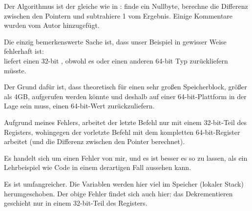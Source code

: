 



Der Algorithmus ist der gleiche wie in : 
finde ein Nullbyte, berechne die Differenz zwischen den Pointern und subtrahiere
1 vom Ergebnis. 
Einige Kommentare wurden vom Autor hinzugefügt.

Die einzig bemerkenswerte Sache ist, dass unser Beispiel in gewisser Weise
fehlerhaft ist:\\
 liefert einen 32-bit \Tint, obwohl es  oder
einen anderen 64-bit Typ zurückliefern müsste.

Der Grund dafür ist, dass  theoretisch für einen sehr großen
Speicherblock, größer als 4GB, aufgerufen werden könnte und deshalb auf einer
64-bit-Plattform in der Lage sein muss, einen 64-bit-Wert zurückzuliefern.

Aufgrund meines Fehlers, arbeitet der letzte \SUB Befehl nur mit einem
32-bit-Teil des Registers, wohingegen der vorletzte \SUB Befehl mit dem
kompletten 64-bit-Register arbeitet (und die Differenz zwischen den Pointer
berechnet).

Es handelt sich um einen Fehler von mir, und es ist besser es so zu lassen, als
ein Lehrbeispiel wie Code in einem derartigen Fall aussehen kann.




Es ist umfangreicher. 
Die Variablen werden hier viel im Speicher (lokaler Stack) herumgeschoben.
Der obige Fehler findet sich auch hier: das Dekrementieren geschieht nur in
einem 32-bit-Teil des Registers.
